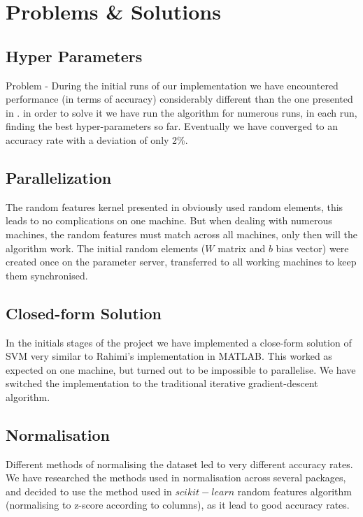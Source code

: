 \documentclass[12pt,a4paper]{article}
\begin{document}
\section{Problems \& Solutions}
\subsection{Hyper Parameters}
Problem - During the initial runs of our implementation we have encountered performance (in terms of accuracy) considerably different than the one presented in \cite{Rahimi07randomfeatures}. in order to solve it we have run the algorithm for numerous runs, in each run, finding the best hyper-parameters so far. Eventually we have converged to an accuracy rate with a deviation of only 2\%.

\subsection{Parallelization}
The random features kernel presented in \cite{Rahimi07randomfeatures} obviously used random elements, this leads to no complications on one machine. But when dealing with numerous machines, the random features must match across all machines, only then will the algorithm work.
The initial random elements ($W$ matrix and $b$ bias vector) were created once on the parameter server, transferred to all working machines to keep them synchronised.

\subsection{Closed-form Solution}
In the initials stages of the project we have implemented a close-form solution of SVM very similar to Rahimi's implementation in MATLAB. This worked as expected on one machine, but turned out to be impossible to parallelise.
We have switched the implementation to the traditional iterative gradient-descent algorithm.

\subsection{Normalisation}
Different methods of normalising the dataset led to very different accuracy rates.
We have researched the methods used in normalisation across several packages, and decided to use the method used in $scikit-learn$ random features algorithm (normalising to z-score according to columns), as it lead to good accuracy rates.
\end{document}
